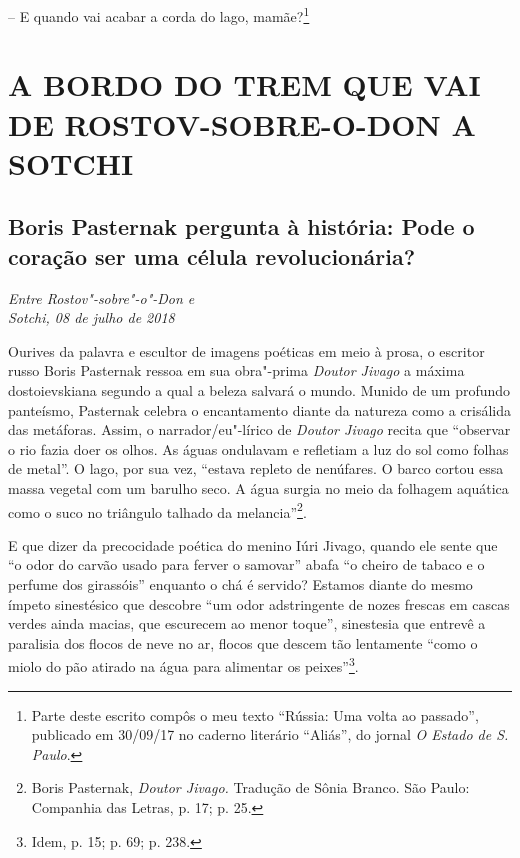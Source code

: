 -- E quando vai acabar a corda do lago, mamãe?\footnote{Parte deste
  escrito compôs o meu texto ``Rússia: Uma volta ao passado'', publicado
  em 30/09/17 no caderno literário ``Aliás'', do jornal \emph{O Estado
  de S. Paulo}.}

\clearpage{\pagestyle{empty}\cleardoublepage}
\movetooddpage
{}
\part*{A BORDO DO TREM QUE VAI DE ROSTOV-SOBRE-O-DON A SOTCHI}

\chapter*{Boris Pasternak pergunta à história: Pode o coração ser uma célula revolucionária?}

\begin{flushright}
\emph{Entre Rostov"-sobre"-o"-Don e\\Sotchi, 08 de julho de 2018}
\end{flushright}

Ourives da palavra e escultor de imagens poéticas em meio à prosa, o
escritor russo Boris Pasternak ressoa em sua obra"-prima \emph{Doutor
Jivago} a máxima dostoievskiana segundo a qual a beleza salvará o mundo.
Munido de um profundo panteísmo, Pasternak celebra o encantamento diante
da natureza como a crisálida das metáforas. Assim, o narrador/eu"-lírico
de \emph{Doutor Jivago} recita que ``observar o rio fazia doer os olhos.
As águas ondulavam e refletiam a luz do sol como folhas de metal''. O
lago, por sua vez, ``estava repleto de nenúfares. O barco cortou essa
massa vegetal com um barulho seco. A água surgia no meio da folhagem
aquática como o suco no triângulo talhado da melancia''\footnote{Boris
  Pasternak, \emph{Doutor Jivago.} Tradução de Sônia Branco. São Paulo:
  Companhia das Letras, p. 17; p. 25.}.

E que dizer da precocidade poética do menino Iúri Jivago, quando ele
sente que ``o odor do carvão usado para ferver o samovar'' abafa ``o
cheiro de tabaco e o perfume dos girassóis'' enquanto o chá é servido?
Estamos diante do mesmo ímpeto sinestésico que descobre ``um odor
adstringente de nozes frescas em cascas verdes ainda macias, que
escurecem ao menor toque'', sinestesia que entrevê a paralisia dos
flocos de neve no ar, flocos que descem tão lentamente ``como o miolo do
pão atirado na água para alimentar os peixes''\footnote{Idem, p. 15; p.
  69; p. 238.}.

